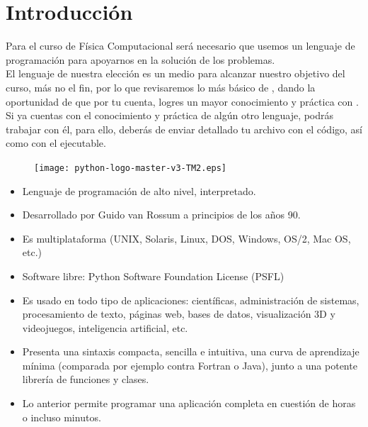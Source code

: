 \section{Introducción}
\begin{frame}
Para el curso de Física Computacional será necesario que usemos un lenguaje de programación para apoyarnos en la solución de los problemas.
\\
\bigskip
El lenguaje de nuestra elección es un medio para alcanzar nuestro objetivo del curso, más no el fin, por lo que revisaremos lo más básico de \python, dando la oportunidad de que por tu cuenta, logres un mayor conocimiento y práctica con \python.
\\
\bigskip
Si ya cuentas con el conocimiento y práctica de algún otro lenguaje, podrás trabajar con él, para ello, deberás de enviar detallado tu archivo con el código, así como con el ejecutable.
\end{frame}
\begin{frame}
\begin{figure}
	\centering
	\texttt{[image: python-logo-master-v3-TM2.eps]} 
\end{figure}
\begin{uncoverenv}
\begin{itemize}[<+->]
\item Lenguaje de programación de alto nivel, interpretado.
\item Desarrollado por Guido van Rossum a principios de
los años 90.
\item Es multiplataforma (UNIX, Solaris, Linux, DOS, Windows, OS/2, Mac OS, etc.)
\item Software libre: Python Software Foundation License (PSFL)
\end{itemize}
\end{uncoverenv}
\end{frame}
\begin{frame}
\begin{uncoverenv}
\begin{itemize}[<+->]
\item Es usado en todo tipo de aplicaciones: científicas, administración de sistemas, procesamiento de texto, páginas web, bases de datos, visualización 3D y videojuegos, inteligencia artificial, etc.
\item Presenta una sintaxis compacta, sencilla e intuitiva, una curva de aprendizaje mínima (comparada por ejemplo contra Fortran o Java), junto a una potente librería de funciones y clases.
\item Lo anterior permite programar una aplicación completa en cuestión de horas o incluso minutos.
\end{itemize}
\end{uncoverenv}
\end{frame}
